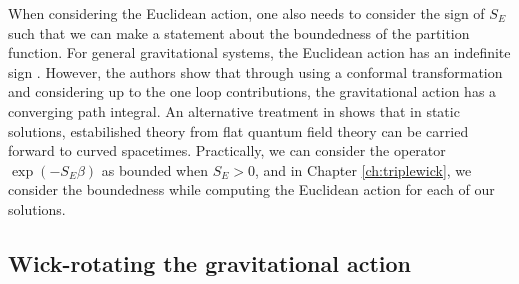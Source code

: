 When considering the Euclidean action, one also needs to consider the sign of $S_E$ such that we can make a statement about the boundedness of the partition function. For general gravitational systems, the Euclidean action  has an indefinite sign \cite{Gibbons:1978ac}. However, the authors show that through using a conformal transformation and considering up to the one loop contributions, the gravitational action has a converging path integral. An alternative treatment in \cite{Gibbons:1978ac} shows that in static solutions, estabilished theory from flat quantum field theory can be carried forward to curved spacetimes. Practically, we can consider the operator $\exp\left(-S_E \beta \right)$ as bounded when $S_E > 0$, and in Chapter \ref{ch:triplewick}, we consider the boundedness while computing the Euclidean action for each of our solutions. 

\subsection{Wick-rotating the gravitational action}

